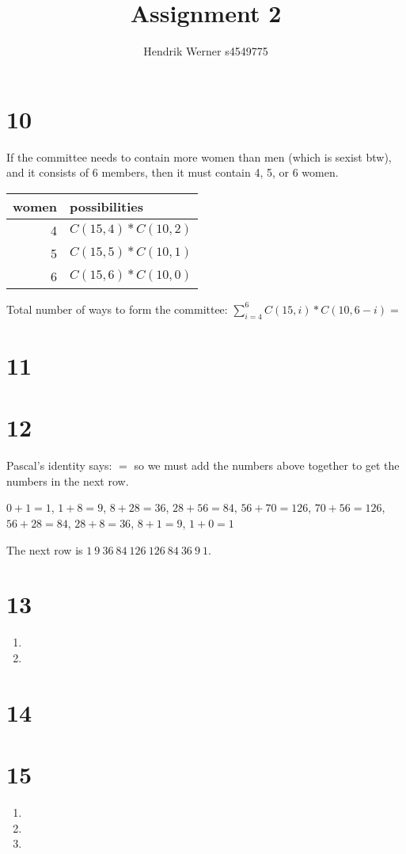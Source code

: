 \documentclass[12pt]{article}
\title{Assignment 2}
\author{
	Hendrik Werner s4549775
}
\begin{document}
\maketitle

\section*{10}
If the committee needs to contain more women than men (which is sexist btw), and it consists of 6 members, then it must contain 4, 5, or 6 women.

\begin{tabular}{r|l}
	women & possibilities\\\hline
	4 & $C(15, 4) * C(10, 2)$\\
	5 & $C(15, 5) * C(10, 1)$\\
	6 & $C(15, 6) * C(10, 0)$
\end{tabular}

Total number of ways to form the committee: $\sum_{i=4}^{6} C(15, i) * C(10, 6 - i) = $

\section*{11}

\section*{12}
Pascal's identity says: $=$ so we must add the numbers above together to get the numbers in the next row.

$0 + 1 = 1$, $1 + 8 = 9$, $8 + 28 = 36$, $28 + 56 = 84$, $56 + 70 = 126$, $70 + 56 = 126$, $56 + 28 = 84$, $28 + 8 = 36$, $8 + 1 = 9$, $1 + 0 = 1$

The next row is $1\ 9\ 36\ 84\ 126\ 126\ 84\ 36\ 9\ 1$.

\section*{13}
\begin{enumerate}[a]
	\item %
	\item %
\end{enumerate}

\section*{14}

\section*{15}
\begin{enumerate}[a]
	\item %
	\item %
	\item %
\end{enumerate}
\end{document}

